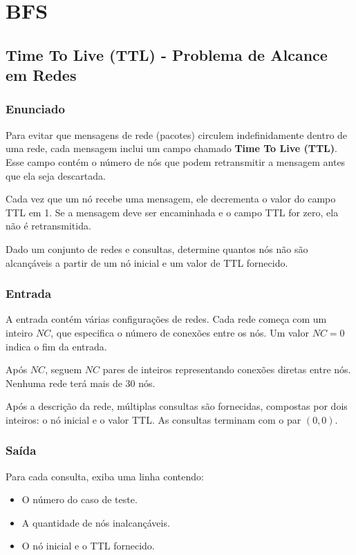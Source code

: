 \section{BFS}
\subsection{Time To Live (TTL) - Problema de Alcance em Redes}

\subsubsection*{Enunciado}

Para evitar que mensagens de rede (pacotes) circulem indefinidamente dentro de uma rede, cada mensagem inclui um campo chamado \textbf{Time To Live (TTL)}. Esse campo contém o número de nós que podem retransmitir a mensagem antes que ela seja descartada.

Cada vez que um nó recebe uma mensagem, ele decrementa o valor do campo TTL em 1. Se a mensagem deve ser encaminhada e o campo TTL for zero, ela não é retransmitida.

Dado um conjunto de redes e consultas, determine quantos nós não são alcançáveis a partir de um nó inicial e um valor de TTL fornecido.

\subsubsection*{Entrada}

A entrada contém várias configurações de redes. Cada rede começa com um inteiro \( NC \), que especifica o número de conexões entre os nós. Um valor \( NC = 0 \) indica o fim da entrada.

Após \( NC \), seguem \( NC \) pares de inteiros representando conexões diretas entre nós. Nenhuma rede terá mais de 30 nós.

Após a descrição da rede, múltiplas consultas são fornecidas, compostas por dois inteiros: o nó inicial e o valor TTL. As consultas terminam com o par \( (0,0) \).

\subsubsection*{Saída}

Para cada consulta, exiba uma linha contendo:
\begin{itemize}
    \item O número do caso de teste.
    \item A quantidade de nós inalcançáveis.
    \item O nó inicial e o TTL fornecido.
\end{itemize}

